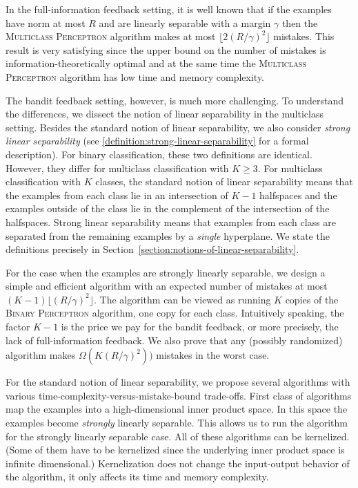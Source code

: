 In the full-information feedback setting, it is well known that if the examples
have norm at most $R$ and are linearly separable with a margin $\gamma$ then the
\textsc{Multiclass Perceptron} algorithm makes at most $\lfloor 2(R/\gamma)^2
\rfloor$ mistakes. This result is very satisfying since the upper bound on the
number of mistakes is information-theoretically optimal and at the same time the
\textsc{Multiclass Perceptron} algorithm has low time and memory complexity.

The bandit feedback setting, however, is much more challenging. To understand
the differences, we dissect the notion of linear separability in the multiclass
setting. Besides the standard notion of linear separability, we also consider
\emph{strong linear separability} (see
\autoref{definition:strong-linear-separability} for a formal description). For
binary classification, these two definitions are identical. However, they differ
for multiclass classification with $K \geq 3$. For multiclass classification
with $K$ classes, the standard notion of linear separability means that the
examples from each class lie in an intersection of $K-1$ halfspaces and the
examples outside of the class lie in the complement of the intersection of the
halfspaces. Strong linear separability means that examples from each class are
separated from the remaining examples by a \emph{single} hyperplane. We state
the definitions precisely in
Section~\ref{section:notions-of-linear-separability}.

For the case when the examples are strongly linearly separable, we design a
simple and efficient algorithm with an expected number of mistakes at most $(K-1)
\lfloor (R/\gamma)^2 \rfloor$. The algorithm can be viewed as running $K$ copies
of the \textsc{Binary Perceptron} algorithm, one copy for each class.
Intuitively speaking, the factor $K-1$ is the price we pay for the bandit
feedback, or more precisely, the lack of full-information feedback. We also
prove that any (possibly randomized) algorithm makes $\Omega(K (R/\gamma)^2))$
mistakes in the worst case.

For the standard notion of linear separability, we propose several algorithms
with various time-complexity-versus-mistake-bound trade-offs.
First class of
algorithms map the examples into a high-dimensional inner product space. In this
space the examples become \emph{strongly} linearly separable. This allows us to
run the algorithm for the strongly linearly separable case. All of these
algorithms can be kernelized. (Some of them have to be kernelized since the
underlying inner product space is infinite dimensional.) Kernelization does not
change the input-output behavior of the algorithm, it only affects its time
and memory complexity.

